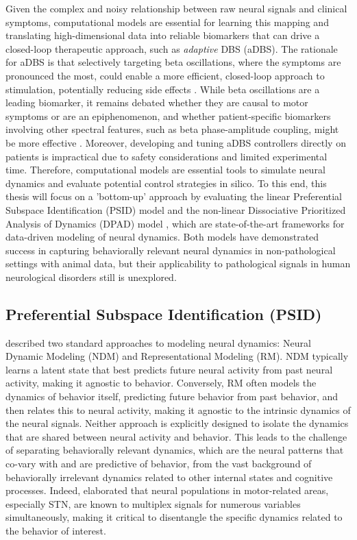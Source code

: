 \documentclass[12pt, a4paper]{article}
\begin{document}
Given the complex and noisy relationship between raw neural signals and clinical symptoms, computational models are essential for learning this mapping and translating high-dimensional data into reliable biomarkers that can drive a closed-loop therapeutic approach, such as \textit{adaptive} DBS (aDBS). The rationale for aDBS is that selectively targeting beta oscillations, where the symptoms are pronounced the most, could enable a more efficient, closed-loop approach to stimulation, potentially reducing side effects \parencite{littleAdaptiveDeepBrain2013}. While beta oscillations are a leading biomarker, it remains debated whether they are causal to motor symptoms or are an epiphenomenon, and whether patient-specific biomarkers involving other spectral features, such as beta phase-amplitude coupling, might be more effective \parencite{swannGammaOscillationsHyperkinetic2016, wuComputationalModelsAdvance2024}. Moreover, developing and tuning aDBS controllers directly on patients is impractical due to safety considerations and limited experimental time. Therefore, computational models are essential tools to simulate neural dynamics and evaluate potential control strategies in silico. To this end, this thesis will focus on a 'bottom-up' approach by evaluating the linear Preferential Subspace Identification (PSID) model \parencite{saniModelingBehaviorallyRelevant2021} and the non-linear Dissociative Prioritized Analysis of Dynamics (DPAD) model \parencite{saniDissociativePrioritizedModeling2024}, which are state-of-the-art frameworks for data-driven modeling of neural dynamics. Both models have demonstrated success in capturing behaviorally relevant neural dynamics in non-pathological settings with animal data, but their applicability to pathological signals in human neurological disorders still is unexplored. 
\subsection{Preferential Subspace Identification (PSID)}
\textcite{saniModelingBehaviorallyRelevant2021} described two standard approaches to modeling neural dynamics: Neural Dynamic Modeling (NDM) and Representational Modeling (RM). NDM typically learns a latent state that best predicts future neural activity from past neural activity, making it agnostic to behavior. Conversely, RM often models the dynamics of behavior itself, predicting future behavior from past behavior, and then relates this to neural activity, making it agnostic to the intrinsic dynamics of the neural signals. Neither approach is explicitly designed to isolate the dynamics that are shared between neural activity and behavior. This leads to the challenge of separating behaviorally relevant dynamics, which are the neural patterns that co-vary with and are predictive of behavior, from the vast background of behaviorally irrelevant dynamics related to other internal states and cognitive processes. Indeed, \textcite{wuMixedSelectivitySubthalamic2025} elaborated that neural populations in motor-related areas, especially STN, are known to multiplex signals for numerous variables simultaneously, making it critical to disentangle the specific dynamics related to the behavior of interest.
\end{document}
